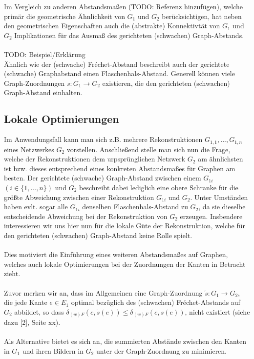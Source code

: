 \documentclass[a4paper, 12pt, twoside]{article}
\theoremstyle{Format1} %
\begin{document}
Im Vergleich zu anderen Abstandsmaßen (TODO: Referenz hinzufügen), welche primär die geometrische Ähnlichkeit von $G_1$ und $G_2$ berücksichtigen, hat neben den geometrischen Eigenschaften auch die (abstrakte) Konnektivtät von $G_1$ und $G_2$
Implikationen für das Ausmaß des gerichteten (schwachen) Graph-Abstands.
\\
\\
TODO: Beispiel/Erklärung
\\
Ähnlich wie der (schwache) Fréchet-Abstand beschreibt auch der gerichtete (schwache) Graphabstand einen Flaschenhals-Abstand.
Generell können viele Graph-Zuordnungen $s: G_1 \to G_2$ existieren, die den gerichteten (schwachen) Graph-Abstand einhalten.

\subsection{Lokale Optimierungen}

Im Anwendungsfall kann man sich z.B. mehrere Rekonstruktionen $G_{1,1}, ..., G_{1,n}$ eines Netzwerkes $G_2$ vorstellen.
Anschließend stelle man sich nun die Frage, welche der Rekonstruktionen dem urpsprünglichen Netzwerk $G_2$ am ähnlichsten ist bzw. dieses entsprechend eines konkreten Abstandsmaßes
für Graphen am besten.
Der gerichtete (schwache) Graph-Abstand zwischen einem $G_{1i}$ $(i \in \{1,...,n\})$ und $G_2$ beschreibt dabei lediglich eine obere Schranke für die größte Abweichung zwischen
einer Rekonstruktion $G_{1i}$ und $G_2$.
Unter Umständen haben evlt. sogar alle $G_{1i}$ denselben Flaschenhals-Abstand zu $G_2$, da sie dieselbe entscheidende Abweichung bei der Rekonstruktion von $G_2$ erzeugen.
Insbendere interessieren wir uns hier nun für die lokale Güte der Rekonstruktion, welche für den gerichteten (schwachen) Graph-Abstand keine Rolle spielt.
\\
\\
Dies motiviert die Einführung eines weiteren Abstandsmaßes auf Graphen, welches auch lokale Optimierungen bei der Zuordnungen der Kanten in Betracht zieht.
\\
\\
Zuvor merken wir an, dass im Allgemeinen eine Graph-Zuordnung $\tilde{s}: G_1 \to G_2$, die jede Kante $e \in E_1$ optimal bezüglich des (schwachen)
Fréchet-Abstands auf $G_2$ abbildet, so dass $\delta_{(w)F}(e, \tilde{s}(e)) \leq \delta_{(w)F}(e, s(e))$, nicht existiert (siehe dazu [2], Seite xx).
\\
\\
Als Alternative bietet es sich an, die summierten Abstände zwischen den Kanten in $G_1$ und ihren Bildern in $G_2$ unter der Graph-Zuordnung zu minimieren.
\end{document}
